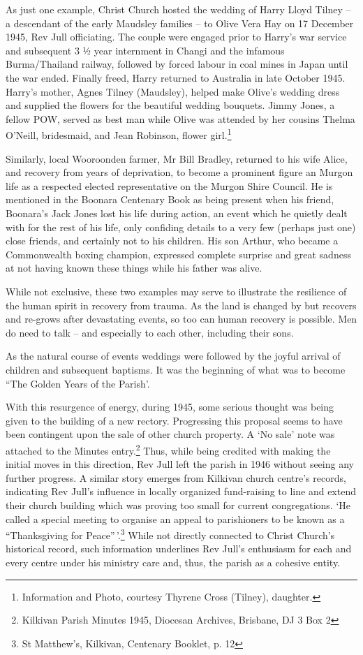 As just one example, Christ Church hosted the wedding of Harry Lloyd
Tilney -- a descendant of the early Maudsley families -- to Olive Vera
Hay on 17 December 1945, Rev Jull officiating. The couple were engaged
prior to Harry's war service and subsequent 3 ½ year internment in
Changi and the infamous Burma/Thailand railway, followed by forced
labour in coal mines in Japan until the war ended. Finally freed, Harry
returned to Australia in late October 1945. Harry's mother, Agnes Tilney
(Maudsley), helped make Olive's wedding dress and supplied the flowers
for the beautiful wedding bouquets. Jimmy Jones, a fellow POW, served as
best man while Olive was attended by her cousins Thelma O'Neill,
bridesmaid, and Jean Robinson, flower girl.\footnote{Information and
  Photo, courtesy Thyrene Cross (Tilney), daughter.}

Similarly, local Wooroonden farmer, Mr Bill Bradley, returned to his
wife Alice, and recovery from years of deprivation, to become a
prominent figure an Murgon life as a respected elected representative on
the Murgon Shire Council. He is mentioned in the Boonara Centenary Book
as being present when his friend, Boonara's Jack Jones lost his life
during action, an event which he quietly dealt with for the rest of his
life, only confiding details to a very few (perhaps just one) close
friends, and certainly not to his children. His son Arthur, who became a
Commonwealth boxing champion, expressed complete surprise and great
sadness at not having known these things while his father was alive.

While not exclusive, these two examples may serve to illustrate the
resilience of the human spirit in recovery from trauma. As the land is
changed by but recovers and re-grows after devastating events, so too
can human recovery is possible. Men do need to talk -- and especially to
each other, including their sons.

As the natural course of events weddings were followed by the joyful
arrival of children and subsequent baptisms. It was the beginning of
what was to become ``The Golden Years of the Parish'.

With this resurgence of energy, during 1945, some serious thought was
being given to the building of a new rectory. Progressing this proposal
seems to have been contingent upon the sale of other church property. A
`No sale' note was attached to the Minutes entry.\footnote{Kilkivan
  Parish Minutes 1945, Diocesan Archives, Brisbane, DJ 3 Box 2} Thus,
while being credited with making the initial moves in this direction,
Rev Jull left the parish in 1946 without seeing any further progress. A
similar story emerges from Kilkivan church centre's records, indicating
Rev Jull's influence in locally organized fund-raising to line and
extend their church building which was proving too small for current
congregations. `He called a special meeting to organise an appeal to
parishioners to be known as a ``Thanksgiving for Peace''\,'.\footnote{St
  Matthew's, Kilkivan, Centenary Booklet, p. 12} While not directly
connected to Christ Church's historical record, such information
underlines Rev Jull's enthusiasm for each and every centre under his
ministry care and, thus, the parish as a cohesive entity.

